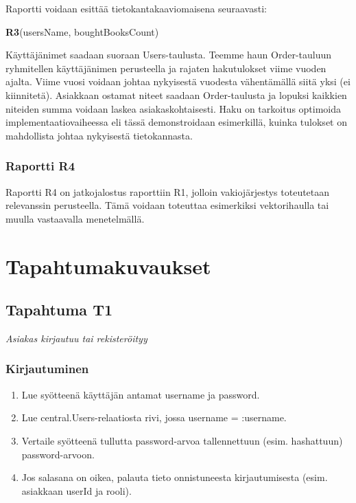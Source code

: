 \documentclass[11pt,a4paper]{article}
\begin{document}
Raportti voidaan esittää tietokantakaaviomaisena seuraavasti:

\textbf{R3}(usersName, boughtBooksCount)

Käyttäjänimet saadaan suoraan Users-taulusta. Teemme haun Order-tauluun ryhmitellen käyttäjänimen perusteella ja rajaten hakutulokset viime vuoden ajalta. Viime vuosi voidaan johtaa nykyisestä vuodesta vähentämällä siitä yksi (ei kiinnitetä). Asiakkaan ostamat niteet saadaan Order-taulusta ja lopuksi kaikkien niteiden summa voidaan laskea asiakaskohtaisesti. Haku on tarkoitus optimoida implementaatiovaiheessa eli tässä demonstroidaan esimerkillä, kuinka tulokset on mahdollista johtaa nykyisestä tietokannasta.

\subsubsection{Raportti R4}

Raportti R4 on jatkojalostus raporttiin R1, jolloin vakiojärjestys toteutetaan relevanssin perusteella. Tämä voidaan toteuttaa esimerkiksi vektorihaulla tai muulla vastaavalla menetelmällä.

\section{Tapahtumakuvaukset}

\subsection{Tapahtuma T1}
{\large{\textit{Asiakas kirjautuu tai rekisteröityy}}}

\subsubsection{Kirjautuminen}

\begin{enumerate}
	\item Lue syötteenä käyttäjän antamat username ja password.
	\item Lue central.Users-relaatiosta rivi, jossa username = :username.
	\item Vertaile syötteenä tullutta password-arvoa tallennettuun (esim. hashattuun) password-arvoon.
	\item Jos salasana on oikea, palauta tieto onnistuneesta kirjautumisesta (esim. asiakkaan userId ja rooli).
\end{enumerate}
\end{document}
